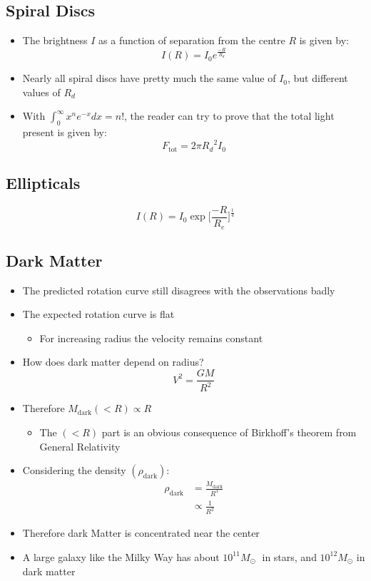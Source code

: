 \documentclass{article}
\begin{document}
\subsection{Spiral Discs}
\begin{itemize}
\item The brightness $I$ as a function of separation from the centre $R$ is given by:
\begin{equation}
I(R)=I_0e^{\frac{-R}{R_d}}
\end{equation}
\item Nearly all spiral discs have pretty much the same value of $I_0$, but different values
of $R_d$
\item With $\int_0^{\infty} x^n e^{-x} dx = n!$, the reader can try to prove that the total light present is given by:
\begin{equation}
    F_\text{tot}=2\pi {R_d}^2 I_0
\end{equation}
\end{itemize}
\subsection{Ellipticals}
\begin{equation}
I(R)=I_0 \exp[{\frac{-R}{R_e}]^{\frac{1}{4}}}
\end{equation}
\subsection{Dark Matter}
\begin{itemize}
\item The predicted rotation curve still disagrees with the observations badly
\item The expected rotation curve is flat
\begin{itemize}
\item For increasing radius the velocity remains constant
\end{itemize}
\item How does dark matter depend on radius?
\begin{equation}
V^2=\frac{GM}{R^2}
\end{equation}
\item Therefore $M_\text{dark}(<R) \propto R$
\begin{itemize}
\item The $(<R)$ part is an obvious consequence of Birkhoff's theorem from General Relativity
\end{itemize}
\item Considering the density $(\rho_\text{dark})$:
\begin{align}
\rho_\text{dark}&=\frac{M_\text{dark}}{R^3}\\
& \propto \frac{1}{R^2}
\end{align}
\item Therefore dark Matter is concentrated near the center
\item A large galaxy like the Milky Way has about $10^{11}M_\odot$ in stars, and $10^{12}M_\odot$ in dark matter
\end{itemize}
\end{document}

